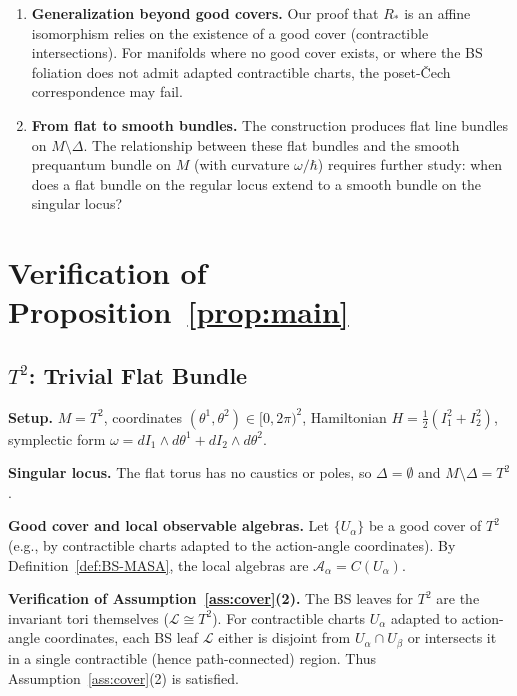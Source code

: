 \documentclass[11pt]{article}
\begin{document}
\begin{enumerate}
\item \textbf{Generalization beyond good covers.}
Our proof that $R_*$ is an affine isomorphism relies on the existence
of a good cover (contractible intersections). For manifolds where no
good cover exists, or where the BS foliation does not admit adapted
contractible charts, the poset-\v{C}ech correspondence may fail.

\item \textbf{From flat to smooth bundles.}
The construction produces flat line bundles on $M \setminus \Delta$.
The relationship between these flat bundles and the smooth prequantum
bundle on $M$ (with curvature $\omega/\hbar$) requires further study:
when does a flat bundle on the regular locus extend to a smooth bundle
on the singular locus?
\end{enumerate}

\appendix
\section{Verification of Proposition~\ref{prop:main}}
\label{app:examples}

\subsection{$T^2$: Trivial Flat Bundle}

\textbf{Setup.}
$M = T^2$, coordinates $(\theta^1, \theta^2) \in [0,2\pi)^2$,
Hamiltonian $H = \tfrac{1}{2}(I_1^2 + I_2^2)$,
symplectic form $\omega = dI_1 \wedge d\theta^1 + dI_2 \wedge d\theta^2$.

\textbf{Singular locus.}
The flat torus has no caustics or poles, so $\Delta = \emptyset$
and $M \setminus \Delta = T^2$.

\textbf{Good cover and local observable algebras.}
Let $\{U_\alpha\}$ be a good cover of $T^2$ (e.g., by contractible charts
adapted to the action-angle coordinates). By Definition~\ref{def:BS-MASA},
the local algebras are $\mathcal{A}_\alpha = C(U_\alpha)$.

\textbf{Verification of Assumption~\ref{ass:cover}(2).}
The BS leaves for $T^2$ are the invariant tori themselves ($\mathcal{L} \cong T^2$).
For contractible charts $U_\alpha$ adapted to action-angle coordinates,
each BS leaf $\mathcal{L}$ either is disjoint from $U_\alpha \cap U_\beta$
or intersects it in a single contractible (hence path-connected) region.
Thus Assumption~\ref{ass:cover}(2) is satisfied.
\end{document}
